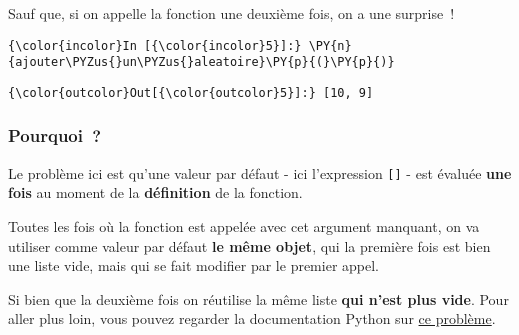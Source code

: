     Sauf que, si on appelle la fonction une deuxième fois, on a une
surprise~!

    \begin{Verbatim}[commandchars=\\\{\}]
{\color{incolor}In [{\color{incolor}5}]:} \PY{n}{ajouter\PYZus{}un\PYZus{}aleatoire}\PY{p}{(}\PY{p}{)}
\end{Verbatim}


\begin{Verbatim}[commandchars=\\\{\}]
{\color{outcolor}Out[{\color{outcolor}5}]:} [10, 9]
\end{Verbatim}
            
    \hypertarget{pourquoi}{%
\subsubsection{Pourquoi~?}\label{pourquoi}}

    Le problème ici est qu'une valeur par défaut - ici l'expression
\texttt{{[}{]}} - est évaluée \textbf{une fois} au moment de la
\textbf{définition} de la fonction.

Toutes les fois où la fonction est appelée avec cet argument manquant,
on va utiliser comme valeur par défaut \textbf{le même objet}, qui la
première fois est bien une liste vide, mais qui se fait modifier par le
premier appel.

Si bien que la deuxième fois on réutilise la même liste \textbf{qui
n'est plus vide}. Pour aller plus loin, vous pouvez regarder la
documentation Python sur
\href{https://docs.python.org/3/faq/programming.html\#why-are-default-values-shared-between-objects}{ce
problème}.


    
    
    
